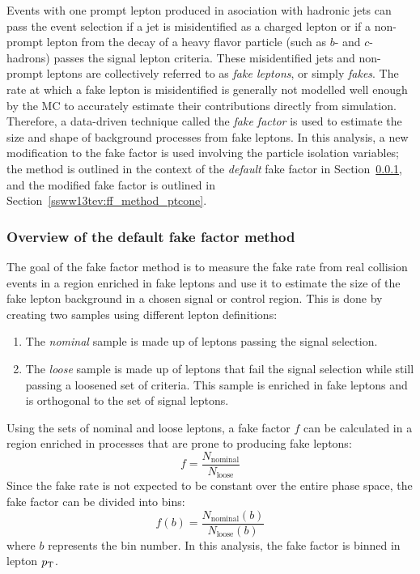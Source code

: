 Events with one prompt lepton produced in asociation with hadronic jets can pass the event selection if a jet is misidentified as a charged lepton or if a non-prompt lepton from the decay of a heavy flavor particle (such as $b$- and $c$-hadrons) passes the signal lepton criteria.
These misidentified jets and non-prompt leptons are collectively referred to as \emph{fake leptons}, or simply \emph{fakes}.
The rate at which a fake lepton is misidentified is generally not modelled well enough by the MC to accurately estimate their contributions directly from simulation.
Therefore, a data-driven technique called the \emph{fake factor} is used to estimate the size and shape of background processes from fake leptons.
In this analysis, a new modification to the fake factor is used involving the particle isolation variables; the method is outlined in the context of the \emph{default} fake factor in Section~\ref{ssww13tev:ff_method_default}, and the modified fake factor is outlined in Section~\ref{ssww13tev:ff_method_ptcone}.

%
\subsubsection{Overview of the default fake factor method}\label{ssww13tev:ff_method_default}
The goal of the fake factor method is to measure the fake rate from real collision events in a region enriched in fake leptons and use it to estimate the size of the fake lepton background in a chosen signal or control region.
This is done by creating two samples using different lepton definitions: 
\begin{enumerate}
\item The \emph{nominal} sample is made up of leptons passing the signal selection.
\item The \emph{loose} sample is made up of leptons that fail the signal selection while still passing a loosened set of criteria.  This sample is enriched in fake leptons and is orthogonal to the set of signal leptons.
\end{enumerate}
Using the sets of nominal and loose leptons, a fake factor $f$ can be calculated in a region enriched in processes that are prone to producing fake leptons:
\begin{equation}
f = \frac{N_{\textrm{nominal}}}{N_{\textrm{loose}}}
\label{eq:ssww13tev_ff_default_unbinned}
\end{equation}
Since the fake rate is not expected to be constant over the entire phase space, the fake factor can be divided into bins:
\begin{equation}
f(b) = \frac{N_{\textrm{nominal}}(b)}{N_{\textrm{loose}}(b)}
\label{eq:ssww13tev_ff_default_binned}
\end{equation}
where $b$ represents the bin number.
In this analysis, the fake factor is binned in lepton $p_{\mathrm{T}}$.

